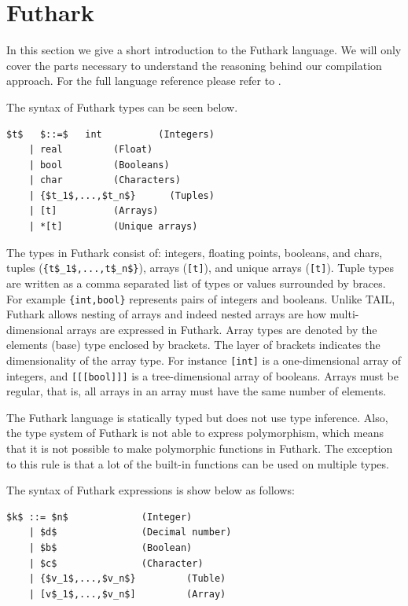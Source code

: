 \documentclass[11pt]{article}
\begin{document}
\section{Futhark}
\label{sec:futhark}

In this section we give a short introduction to the Futhark language. We will only cover the parts necessary to understand
the reasoning behind our compilation approach. For the full language reference please refer to \cite{TroelsHenriksen}.

The syntax of Futhark types can be seen below.
\begin{lstlisting}[numbers=none,frame=none]
$t$   $::=$   int          (Integers)
    | real         (Float)
    | bool         (Booleans)
    | char         (Characters)
    | {$t_1$,...,$t_n$}      (Tuples)
    | [t]          (Arrays)
    | *[t]         (Unique arrays)
\end{lstlisting}
The types in Futhark consist of: integers, floating points, booleans, and chars, tuples (\lstinline |{t$_1$,...,t$_n$}|), arrays ({\tt [t]}), and unique arrays ({\tt *[t]}).
Tuple types are written as a comma separated list of types or values surrounded by braces.
For example \lstinline|{int,bool}| represents pairs of integers and booleans.
Unlike TAIL, Futhark allows nesting of arrays and indeed nested arrays are how multi-dimensional arrays are expressed in Futhark.
Array types are denoted by the elements (base) type enclosed by brackets.
The layer of brackets indicates the dimensionality of the array type.
For instance {\tt [int]} is a one-dimensional array of integers, and {\tt [[[bool]]]} is a tree-dimensional array of booleans.
Arrays must be regular, that is, all arrays in an array must have the same number of elements.

The Futhark language is statically typed but does not use type inference.
Also, the type system of Futhark is not able to express polymorphism, which means that it is not possible to make polymorphic functions in Futhark.
The exception to this rule is that a lot of the built-in functions can be used on multiple types.

The syntax of Futhark expressions is show below as follows:
\begin{lstlisting}[numbers=none,frame=none]
$k$ ::= $n$				(Integer)
    | $d$				(Decimal number)
    | $b$				(Boolean) 		
    | $c$ 				(Character)
    | {$v_1$,...,$v_n$} 		(Tuble)
    | [v$_1$,...,$v_n$] 		(Array)
\end{lstlisting}
\end{document}
